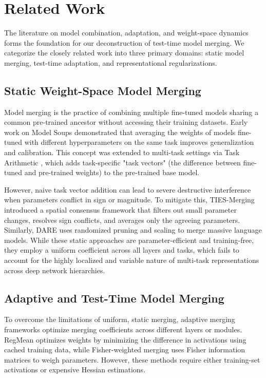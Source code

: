\section{Related Work}
\label{sec:related_work}

The literature on model combination, adaptation, and weight-space dynamics forms the foundation for our deconstruction of test-time model merging. We categorize the closely related work into three primary domains: static model merging, test-time adaptation, and representational regularizations.

\subsection{Static Weight-Space Model Merging}
Model merging is the practice of combining multiple fine-tuned models sharing a common pre-trained ancestor without accessing their training datasets. Early work on Model Soups \cite{wortsman2022model} demonstrated that averaging the weights of models fine-tuned with different hyperparameters on the same task improves generalization and calibration. This concept was extended to multi-task settings via Task Arithmetic \cite{ilharco2022editing}, which adds task-specific "task vectors" (the difference between fine-tuned and pre-trained weights) to the pre-trained base model. 

However, naive task vector addition can lead to severe destructive interference when parameters conflict in sign or magnitude. To mitigate this, TIES-Merging \cite{yadav2023resolving} introduced a spatial consensus framework that filters out small parameter changes, resolves sign conflicts, and averages only the agreeing parameters. Similarly, DARE \cite{yu2023language} uses randomized pruning and scaling to merge massive language models. While these static approaches are parameter-efficient and training-free, they employ a uniform coefficient across all layers and tasks, which fails to account for the highly localized and variable nature of multi-task representations across deep network hierarchies.

\subsection{Adaptive and Test-Time Model Merging}
To overcome the limitations of uniform, static merging, adaptive merging frameworks optimize merging coefficients across different layers or modules. RegMean \cite{jin2023regmean} optimizes weights by minimizing the difference in activations using cached training data, while Fisher-weighted merging \cite{matena2022merging} uses Fisher information matrices to weigh parameters. However, these methods require either training-set activations or expensive Hessian estimations.

